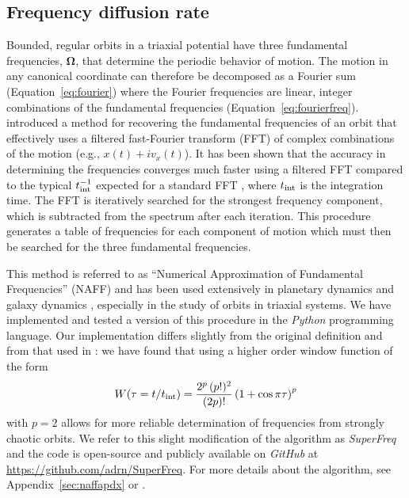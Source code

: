 \documentclass[letterpaper,12pt,preprint]{aastex}
\newcommand{\bs}[1]{\boldsymbol{#1}}
\newcommand{\inttime}{t_{\rm int}}
\newcommand{\project}[1]{\textsl{#1}}
\newcommand{\superfreq}{\project{SuperFreq}}
\begin{document}
\subsection{Frequency diffusion rate}\label{sec:naff}

Bounded, regular orbits in a triaxial potential have three fundamental frequencies, $\bs{\Omega}$, that determine the periodic behavior of motion. The motion in any canonical coordinate can therefore be decomposed as a Fourier sum (Equation~\ref{eq:fourier}) where the Fourier frequencies are linear, integer combinations of the fundamental frequencies (Equation~\ref{eq:fourierfreq}). \cite{laskar93} introduced a method for recovering the fundamental frequencies of an orbit that effectively uses a filtered fast-Fourier transform (FFT) of complex combinations of the motion (e.g., $x(t) + i v_x(t)$). It has been shown that the accuracy in determining the frequencies converges much faster using a filtered FFT compared to the typical $\inttime^{-1}$ expected for a standard FFT \citep{laskar99}, where $\inttime$ is the integration time. The FFT is iteratively searched for the strongest frequency component, which is subtracted from the spectrum after each iteration. This procedure generates a table of frequencies for each component of motion which must then be searched for the three fundamental frequencies.

This method is referred to as ``Numerical Approximation of Fundamental Frequencies'' (NAFF) and has been used extensively in planetary dynamics \citep[e.g.,][]{laskar93b, laskar96} and galaxy dynamics \citep{papaphilippou98, valluri98}, especially in the study of orbits in triaxial systems. We have implemented and tested a version of this procedure in the \project{Python} programming language. Our implementation differs slightly from the original definition and from that used in \cite{valluri98}: we have found that using a higher order window function \citep[e.g.,][]{hunter02} of the form
\begin{equation}
	W(\tau=t/\inttime) = \frac{2^p \, (p!)^2}{(2p)!} \left( 1 + \cos \pi \tau\right)^p
\end{equation}
with $p=2$ allows for more reliable determination of frequencies from strongly chaotic orbits. We refer to this slight modification of the algorithm as \superfreq\ \citep{superfreq} and the code is open-source and publicly available on \project{GitHub} at \url{https://github.com/adrn/SuperFreq}. For more details about the algorithm, see Appendix~\ref{sec:naffapdx} or \cite{laskar88, laskar93, papaphilippou96}.
\end{document}
